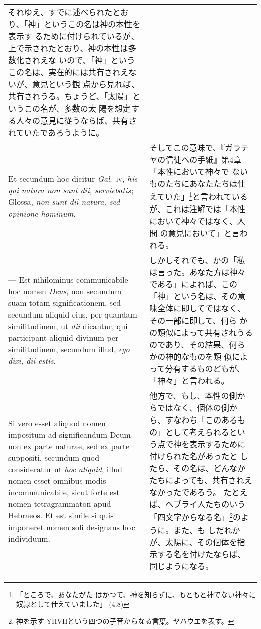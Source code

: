 \documentclass[paper=a4paper,fontsize=10pt,jafontsize=9pt,titlepage]{jlreq}
\begin{document}
\begin{longtable}{p{21em}p{21em}}
それゆえ、すでに述べられたとおり、「神」というこの名は神の本性を表示す
るために付けられているが、上で示されたとおり、神の本性は多数化されえな
いので、「神」というこの名は、実在的には共有されえないが、意見という観
点から見れば、共有されうる。ちょうど、「太陽」というこの名が、多数の太
陽を想定する人々の意見に従うならば、共有されていたであろうように。

\\

Et secundum hoc dicitur {\itshape Gal}.~{\scshape iv}, {\itshape his
qui natura non sunt dii, serviebatis}; Glossa, {\itshape non sunt dii
natura, sed opinione hominum}.

&

そしてこの意味で、『ガラテヤの信徒への手紙』第4章「本性において神々で
ないものたちにあなたたちは仕えていた」\footnote{「ところで、あなたがた
はかつて、神を知らずに、もともと神でない神々に奴隷として仕えていました」
(4:8)}と言われているが、これは注解では「本性において神々ではなく、人間
の意見において」と言われる。

\\

--- Est nihilominus communicabile hoc nomen {\itshape Deus}, non
secundum suam totam significationem, sed secundum aliquid eius, per
quandam similitudinem, ut {\itshape dii} dicantur, qui participant
aliquid divinum per similitudinem, secundum illud, {\itshape ego dixi,
dii estis}.

&

しかしそれでも、かの「私は言った。あなた方は神々である」によれば、この
「神」という名は、その意味全体に即してではなく、その一部に即して、何ら
かの類似によって共有されうるのであり、その結果、何らかの神的なものを類
似によって分有するものどもが、「神々」と言われる。

\\

Si vero esset aliquod nomen impositum ad significandum Deum non ex
parte naturae, sed ex parte suppositi, secundum quod consideratur ut
{\itshape hoc aliquid}, illud nomen esset omnibus modis
incommunicabile, sicut forte est nomen tetragrammaton apud
Hebraeos. Et est simile si quis imponeret nomen soli designans hoc
individuum.

&

他方で、もし、本性の側からではなく、個体の側から、すなわち「このあるも
の」として考えられるという点で神を表示するために付けられた名があったと
したら、その名は、どんなかたちによっても、共有されえなかったであろう。
たとえば、ヘブライ人たちのいう「四文字からなる名」\footnote{神を示す
YHVHという四つの子音からなる言葉。ヤハウエを表す。}のように。また、も
しだれかが、太陽に、その個体を指示する名を付けたならば、同じようになる。


\end{longtable}
\end{document}
